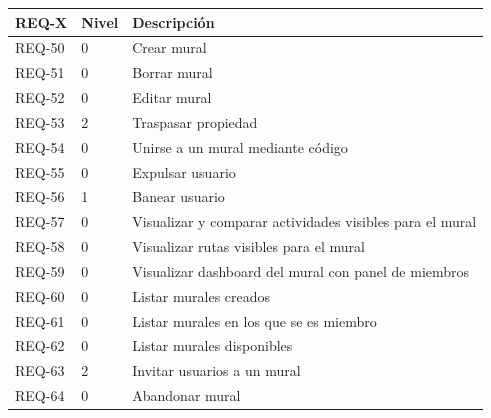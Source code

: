 \begin{longtable}{p{2cm} p{1cm} p{11cm}}
\toprule
\textbf{REQ-X} & \textbf{Nivel} & \textbf{Descripción} \\
\midrule
\endhead

REQ-50 & 0 & Crear mural \\
REQ-51 & 0 & Borrar mural \\
REQ-52 & 0 & Editar mural \\
REQ-53 & 2 & Traspasar propiedad \\
REQ-54 & 0 & Unirse a un mural mediante código \\
REQ-55 & 0 & Expulsar usuario \\
REQ-56 & 1 & Banear usuario \\
REQ-57 & 0 & Visualizar y comparar actividades visibles para el mural \\
REQ-58 & 0 & Visualizar rutas visibles para el mural \\
REQ-59 & 0 & Visualizar dashboard del mural con panel de miembros \\
REQ-60 & 0 & Listar murales creados \\
REQ-61 & 0 & Listar murales en los que se es miembro \\
REQ-62 & 0 & Listar murales disponibles \\
REQ-63 & 2 & Invitar usuarios a un mural \\
REQ-64 & 0 & Abandonar mural \\

\bottomrule
\end{longtable}